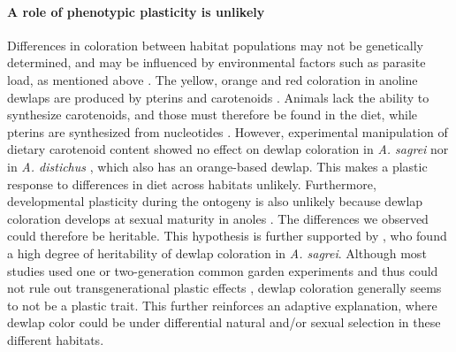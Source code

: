 \paragraph{A role of phenotypic plasticity is unlikely} Differences in coloration between habitat populations may not be genetically determined, and may be influenced by environmental factors such as parasite load, as mentioned above \citep{Cook2013}. The yellow, orange and red coloration in anoline dewlaps are produced by pterins and carotenoids \citep{Ortiz1962, Ortiz1962a, Ortiz1963, Ortiz1966, Macedonia2000, Steffen2007, Steffen2009}. Animals lack the ability to synthesize carotenoids, and those must therefore be found in the diet, while pterins are synthesized from nucleotides \citep{Goodwin1984, Hill2002, Hill2006}. However, experimental manipulation of dietary carotenoid content showed no effect on dewlap coloration in \textit{A. sagrei} \citep{Steffen2010} nor in \textit{A. distichus} \citep{Ng2013}, which also has an orange-based dewlap. This makes a plastic response to differences in diet across habitats unlikely. Furthermore, developmental plasticity during the ontogeny is also unlikely because dewlap coloration develops at sexual maturity in anoles \citep{Ng2013}. The differences we observed could therefore be heritable. This hypothesis is further supported by \citet{Cox2017}, who found a high degree of heritability of dewlap coloration in \textit{A. sagrei}. Although most studies used one or two-generation common garden experiments and thus could not rule out transgenerational plastic effects \citep{Tariel2020}, dewlap coloration generally seems to not be a plastic trait. This further reinforces an adaptive explanation, where dewlap color could be under differential natural and/or sexual selection in these different habitats.\\


